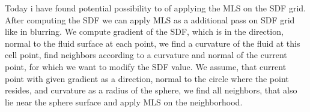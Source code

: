 Today i have found potential possibility to of applying the MLS on the SDF grid. After computing the SDF we can apply MLS as a additional pass on SDF grid like in blurring. We compute gradient of the SDF, which is in the direction, normal to the fluid surface at each point, we find a curvature of the fluid at this cell point, find neighbors according to a curvature and normal of the current point, for which we want to modify the SDF value. We assume, that current point with given gradient as a direction, normal to the circle where the point resides, and curvature as a radius of the sphere, we find all neighbors, that also lie near the sphere surface and apply MLS on the neighborhood.



